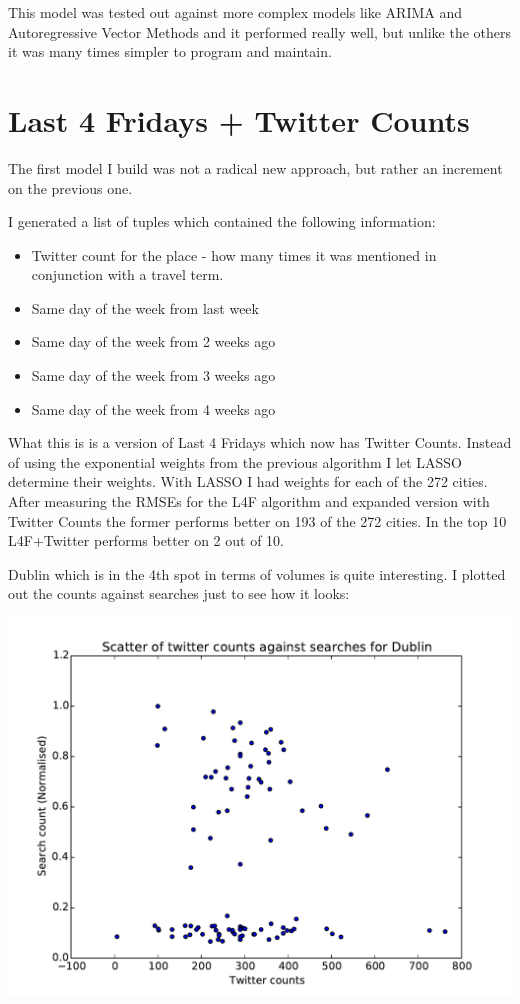 \documentclass[minf,frontabs,twoside,singlespacing,parskip]{infthesis}
\begin{document}
This model was tested out against more complex models like ARIMA and Autoregressive Vector Methods and it performed really well, but unlike the others it was many times simpler to program and maintain.

\section{Last 4 Fridays + Twitter Counts}

The first model I build was not a radical new approach, but rather an increment on the previous one.

I generated a list of tuples which contained the following information:
\begin{itemize}
\item Twitter count for the place - how many times it was mentioned in conjunction with a travel term.
\item Same day of the week from last week
\item Same day of the week from 2 weeks ago
\item Same day of the week from 3 weeks ago
\item Same day of the week from 4 weeks ago
\end{itemize}

What this is is a version of Last 4 Fridays which now has Twitter Counts. Instead of using the exponential weights from the previous algorithm I let LASSO determine their weights.
With LASSO I had weights for each of the 272 cities. After measuring the RMSEs for the L4F algorithm and expanded version with Twitter Counts the former performs better on 193 of the 272 cities. In the top 10 L4F+Twitter performs better on 2 out of 10. 

Dublin which is in the 4th spot in terms of volumes is quite interesting. I plotted out the counts against searches just to see how it looks:

\includegraphics[width=\textwidth]{Dublin}  
\end{document}
